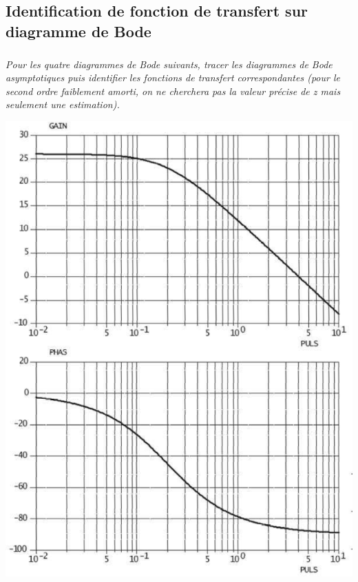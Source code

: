 \documentclass[10pt,fleqn]{article} %
\begin{document}
\begin{multicols}{2}
\section*{Identification de fonction de transfert sur diagramme de Bode}
\subparagraph*{}
\textit{Pour les quatre diagrammes de Bode suivants, tracer les diagrammes de Bode asymptotiques puis identifier les fonctions de transfert correspondantes (pour le second ordre faiblement amorti, on ne cherchera pas la valeur précise de z mais seulement une estimation).}

\begin{center}
\includegraphics[width=\linewidth]{images/img_03}
\end{center}


\end{multicols}
\end{document}
